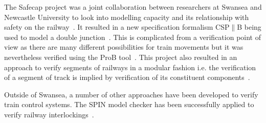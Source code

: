 The Safecap project was a joint collaboration between researchers at Swansea and Newcastle University to look into modelling capacity and its relationship with safety on the railway~\cite{YI12}. It resulted in a new specification formalism CSP$\parallel$B being used to model a double junction~\cite{FM12}. This is complicated from a verification point of view as there are many different possibilities for train movements but it was nevertheless verified using the ProB tool~\cite{ProB}. This project also resulted in an approach to verify segments of railways in a modular fashion i.e. the verification of a segment of track is implied by verification of its constituent components~\cite{FM12b}.

Outside of Swansea, a number of other approaches have been developed to verify train control systems. The SPIN model checker has been successfully applied to verify railway interlockings~\cite{AC98}.


